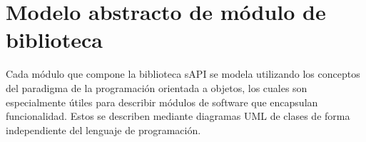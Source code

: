\section{Modelo abstracto de módulo de biblioteca}
\label{sec:modelLibrary}

Cada módulo que compone la biblioteca sAPI se modela utilizando los conceptos del paradigma de la programación orientada a objetos, los cuales son especialmente útiles para describir módulos de software que encapsulan funcionalidad. Estos se describen mediante diagramas UML de clases de forma independiente del lenguaje de programación.

